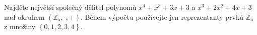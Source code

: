 Najděte největší společný dělitel polynomů $x^{4}+x^{3}+3x+3$ a
$x^{3}+2x^{2}+4x+3$ nad okruhem $\left ( \mathbb{Z}_{5},\cdot ,+ \right )$.
Během výpočtu používejte jen reprezentanty prvků $\mathbb{Z}_{5}$ z množiny
$\left \{ 0,1,2,3,4 \right \}$.
